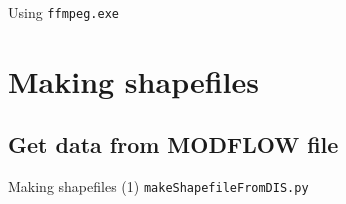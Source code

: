\documentclass[t]{beamer}
\begin{document}
\begin{frame}{Using \texttt{ffmpeg.exe}}
\begin{center}
\end{center}
\end{frame}

\section{Making shapefiles}
\subsection{Get data from MODFLOW file}
\begin{frame}{Making shapefiles (1)}
\small{\texttt{makeShapefileFromDIS.py}}
  \begin{figure}[ht]
  \centering
        \lstset{numbers=left}
        
        
   \end{figure}
\end{frame}
\end{document}
